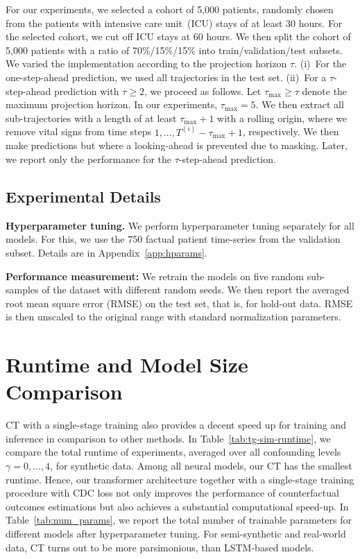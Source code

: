 \documentclass{article}
\theoremstyle{plain}
\theoremstyle{definition}
\theoremstyle{remark}
\newcommand{\shortname}{CT\xspace}
\begin{document}
For our experiments, we selected a cohort of 5,000 patients, randomly chosen from the patients with intensive care unit~(ICU) stays of at least 30 hours. For the selected cohort, we cut off ICU stays at 60 hours. We then split the cohort of 5,000 patients with a ratio of 70\%/15\%/15\% into train/validation/test subsets. We varied the implementation according to the projection horizon $\tau$. (i)~For the one-step-ahead prediction, we used all trajectories in the test set. (ii)~For a $\tau$-step-ahead prediction with $\tau \ge 2$, we proceed as follows. Let $\tau_{\text{max}} \ge \tau$ denote the maximum projection horizon. In our experiments, $\tau_{\text{max}} = 5$. We then extract all sub-trajectories with a length of at least $\tau_{\text{max}} + 1$ with a rolling origin, where we remove vital signs from time steps $1, \dots, T^{(i)} - \tau_{\text{max}} + 1$, respectively. We then make predictions but where a looking-ahead is prevented due to masking. Later, we report only the performance for the $\tau$-step-ahead prediction. 

\subsection{Experimental Details}

\textbf{Hyperparameter tuning.} We perform hyperparameter tuning separately for all models. For this, we use the 750 factual patient time-series from the validation subset. Details are in Appendix~\ref{app:hparams}.

\textbf{Performance measurement:} We retrain the models on five random sub-samples of the dataset with different random seeds. We then report the averaged root mean square error (RMSE) on the test set, that is, for hold-out data. RMSE is then unscaled to the original range with standard normalization parameters.

\clearpage
\section{Runtime and Model Size Comparison} \label{app:runtime}
\shortname with a single-stage training also provides a decent speed up for training and inference in comparison to other methods. In Table~\ref{tab:tg-sim-runtime}, we compare the total runtime of experiments, averaged over all confounding levels $\gamma = 0, \dots, 4$, for synthetic data. Among all neural models, our \shortname has the smallest runtime. Hence, our transformer architecture together with a single-stage training procedure with CDC loss not only improves the performance of counterfactual outcomes estimations but also achieves a substantial computational speed-up. In Table~\ref{tab:num_params}, we report the total number of trainable parameters for different models after hyperparameter tuning. For semi-synthetic and real-world data, \shortname turns out to be more parsimonious, than LSTM-based models.   
\end{document}
